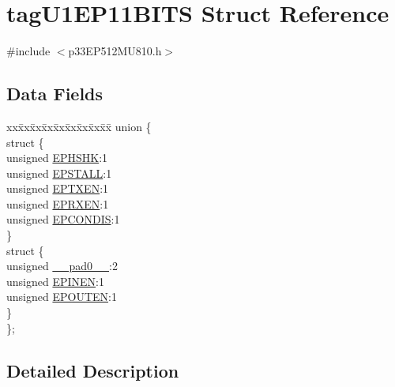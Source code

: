 \hypertarget{structtag_u1_e_p11_b_i_t_s}{}\section{tag\+U1\+E\+P11\+B\+I\+TS Struct Reference}
\label{structtag_u1_e_p11_b_i_t_s}


{\ttfamily \#include $<$p33\+E\+P512\+M\+U810.\+h$>$}

\subsection*{Data Fields}
\begin{DoxyCompactItemize}
\item 
\begin{tabbing}
xx\=xx\=xx\=xx\=xx\=xx\=xx\=xx\=xx\=\kill
union \{\\
\>struct \{\\
\>\>unsigned \hyperlink{structtag_u1_e_p11_b_i_t_s_a0d06430217cb4b189fbe9d0c4b460482}{EPHSHK}:1\\
\>\>unsigned \hyperlink{structtag_u1_e_p11_b_i_t_s_a47042104f04ebe06a23f9789bd400d7e}{EPSTALL}:1\\
\>\>unsigned \hyperlink{structtag_u1_e_p11_b_i_t_s_aa2d88c1be513e759c136823c86a355b4}{EPTXEN}:1\\
\>\>unsigned \hyperlink{structtag_u1_e_p11_b_i_t_s_a8a388d32ceffb87230e660b6793f2857}{EPRXEN}:1\\
\>\>unsigned \hyperlink{structtag_u1_e_p11_b_i_t_s_a1bd26df05d2b5a11b20ee548fce90c3e}{EPCONDIS}:1\\
\>\} \\
\>struct \{\\
\>\>unsigned \hyperlink{structtag_u1_e_p11_b_i_t_s_adf71f3d8410c1f1dbbc96680a92c49af}{\_\_pad0\_\_}:2\\
\>\>unsigned \hyperlink{structtag_u1_e_p11_b_i_t_s_a8b6d98cdf233ac90ff19d16d9a89215e}{EPINEN}:1\\
\>\>unsigned \hyperlink{structtag_u1_e_p11_b_i_t_s_adf87e8acfbb27a5626e21b3e3bd106fd}{EPOUTEN}:1\\
\>\} \\
\}; \\

\end{tabbing}\end{DoxyCompactItemize}


\subsection{Detailed Description}


